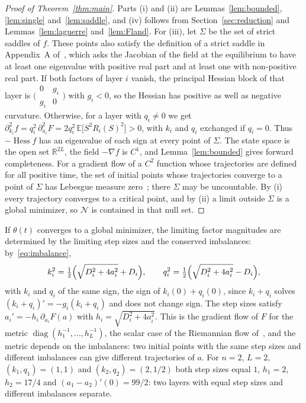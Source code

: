 \documentclass[11pt]{amsart}
\theoremstyle{remark}
\numberwithin{equation}{section}
\newcommand{\EE}{\mathbb{E}}
\newcommand{\RR}{\mathbb{R}}
\DeclareMathOperator{\Hess}{Hess}
\begin{document}
\begin{proof}[Proof of Theorem~\ref{thm:main}]
Parts (i) and (ii) are Lemmas~\ref{lem:bounded}, \ref{lem:single} and~\ref{lem:saddle}, and (iv) follows from Section~\ref{sec:reduction} and Lemmas~\ref{lem:laguerre} and~\ref{lem:Fland}. For (iii), let $\Sigma$ be the set of strict saddles of $f$. These points also satisfy the definition of a strict saddle in Appendix~A of~\cite{OSS}, which asks the Jacobian of the field at the equilibrium to have at least one eigenvalue with positive real part and at least one with non-positive real part. If both factors of layer $i$ vanish, the principal Hessian block of that layer is $\bigl(\begin{smallmatrix}0&g_i\\g_i&0\end{smallmatrix}\bigr)$ with $g_i<0$, so the Hessian has positive as well as negative curvature. Otherwise, for a layer with $q_i\ne0$ we get $\partial_{k_i}^2f=q_i^2\,\partial_{a_i}^2F=2q_i^2\,\EE\bigl[S^2R_i(S)^2\bigr]>0$, with $k_i$ and $q_i$ exchanged if $q_i=0$. Thus $-\Hess f$ has an eigenvalue of each sign at every point of $\Sigma$. The state space is the open set $\RR^{2L}$, the field $-\nabla f$ is $C^1$, and Lemma~\ref{lem:bounded} gives forward completeness. For a gradient flow of a $C^2$ function whose trajectories are defined for all positive time, the set of initial points whose trajectories converge to a point of $\Sigma$ has Lebesgue measure zero~\cite[Appendix~A, Theorem~3 and Corollary~3]{OSS}; there $\Sigma$ may be uncountable. By (i) every trajectory converges to a critical point, and by (ii) a limit outside $\Sigma$ is a global minimizer, so $\mathcal N$ is contained in that null set.
\end{proof}

If $\theta(t)$ converges to a global minimizer, the limiting factor magnitudes are determined by the limiting step sizes and the conserved imbalances: by~\eqref{eq:imbalance},
\[
k_i^2=\tfrac12\Bigl(\sqrt{D_i^2+4a_i^2}+D_i\Bigr),\qquad q_i^2=\tfrac12\Bigl(\sqrt{D_i^2+4a_i^2}-D_i\Bigr),
\]
with $k_i$ and $q_i$ of the same sign, the sign of $k_i(0)+q_i(0)$, since $k_i+q_i$ solves $(k_i+q_i)'=-g_i(k_i+q_i)$ and does not change sign. The step sizes satisfy $a_i'=-h_i\,\partial_{a_i}F(a)$ with $h_i=\sqrt{D_i^2+4a_i^2}$. This is the gradient flow of $F$ for the metric $\operatorname{diag}(h_1^{-1},\dots,h_L^{-1})$, the scalar case of the Riemannian flow of~\cite{BRTW}, and the metric depends on the imbalances: two initial points with the same step sizes and different imbalances can give different trajectories of $a$. For $n=2$, $L=2$, $(k_1,q_1)=(1,1)$ and $(k_2,q_2)=(2,1/2)$ both step sizes equal $1$, $h_1=2$, $h_2=17/4$ and $(a_1-a_2)'(0)=99/2$: two layers with equal step sizes and different imbalances separate.
\end{document}
